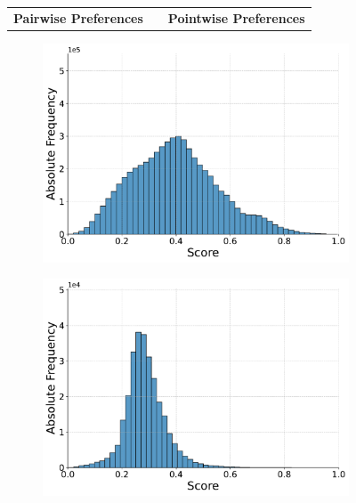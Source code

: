 \begin{figure}[ht!]
    \centering
    \begin{tabular}{ccc}
        \textbf{Pairwise Preferences} & \hspace{2cm} & \textbf{Pointwise Preferences} \\
    \end{tabular}
    \footnotesize
    \begin{subfigure}[b]{0.49\textwidth}
        \centering
        \includegraphics[width=\textwidth]{graphics/seaborn/pairwise_cw22_score_distribution_flan-t5-base.pdf}
        \label{fig:pairwise_flan-t5-base}
    \end{subfigure}
    \hfill
    \begin{subfigure}[b]{0.49\textwidth}
        \centering
        \includegraphics[width=\textwidth]{graphics/seaborn/pointwise_cw22_score_distribution_flan-t5-base.pdf}
        \label{fig:pointwise_flan-t5-base}
    \end{subfigure}


\end{figure}
